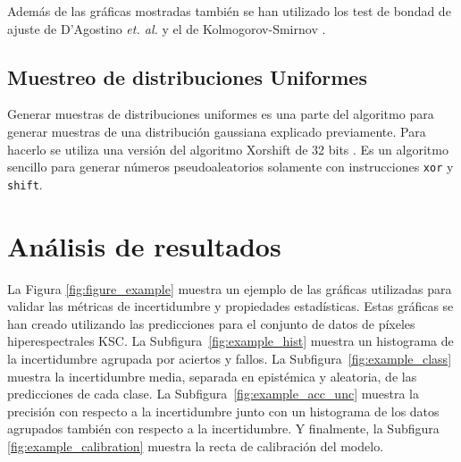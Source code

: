 Además de las gráficas mostradas también se han utilizado los test de bondad de ajuste de D’Agostino \emph{et. al.} \cite{normaltest_1, normaltest_2} y el de Kolmogorov-Smirnov \cite{kstest}.

\subsection{Muestreo de distribuciones Uniformes}

Generar muestras de distribuciones uniformes es una parte del algoritmo para generar muestras de una distribución gaussiana explicado previamente. Para hacerlo se utiliza una versión del algoritmo Xorshift de 32 bits \cite{xorshift}. Es un algoritmo sencillo para generar números pseudoaleatorios solamente con instrucciones \texttt{xor} y \texttt{shift}.

\section{Análisis de resultados} \label{sec:uncertainty_example}

La Figura \ref{fig:figure_example} muestra un ejemplo de las gráficas utilizadas para validar las métricas de incertidumbre y propiedades estadísticas. Estas gráficas se han creado utilizando las predicciones para el conjunto de datos de píxeles hiperespectrales KSC. La Subfigura~\ref{fig:example_hist} muestra un histograma de la incertidumbre agrupada por aciertos y fallos. La Subfigura~\ref{fig:example_class} muestra la incertidumbre media, separada en epistémica y aleatoria, de las predicciones de cada clase. La Subfigura~\ref{fig:example_acc_unc} muestra la precisión con respecto a la incertidumbre junto con un histograma de los datos agrupados también con respecto a la incertidumbre. Y finalmente, la Subfigura~ \ref{fig:example_calibration} muestra la recta de calibración del modelo.

